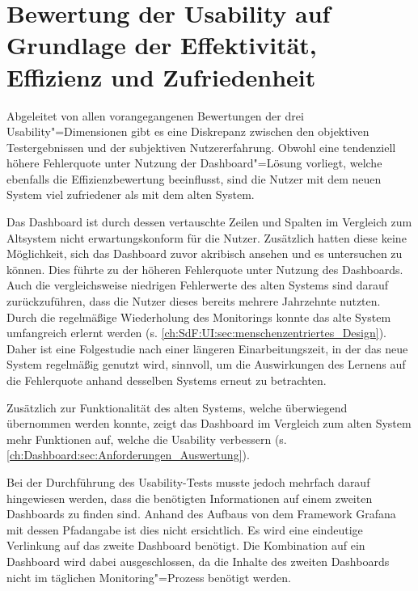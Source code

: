 \section{Bewertung der Usability auf Grundlage der Effektivität, Effizienz und Zufriedenheit}
\label{ch:Diskussion:Usability}

Abgeleitet von allen vorangegangenen Bewertungen der drei Usability"=Dimensionen gibt es eine Diskrepanz zwischen den objektiven Testergebnissen und der subjektiven Nutzererfahrung. Obwohl eine tendenziell höhere Fehlerquote unter Nutzung der Dash\-board"=Lösung vorliegt, welche ebenfalls die Effizienzbewertung beeinflusst, sind die Nutzer mit dem neuen System viel zufriedener als mit dem alten System.

Das Dash\-board ist durch dessen vertauschte Zeilen und Spalten im Vergleich zum Altsystem nicht erwartungskonform für die Nutzer. Zusätzlich hatten diese keine Möglichkeit, sich das Dash\-board zuvor akribisch ansehen und es untersuchen zu können. Dies führte zu der höheren Fehlerquote unter Nutzung des Dash\-boards. Auch die vergleichsweise niedrigen Fehlerwerte des alten Systems sind darauf zurückzuführen, dass die Nutzer dieses bereits mehrere Jahrzehnte nutzten. Durch die regelmäßige Wiederholung des Monitorings konnte das alte System umfangreich erlernt werden (s. \autoref{ch:SdF:UI:sec:menschenzentriertes_Design}). Daher ist eine Folgestudie nach einer längeren Einarbeitungszeit, in der das neue System regelmäßig genutzt wird, sinnvoll, um die Auswirkungen des Lernens auf die Fehlerquote anhand desselben Systems erneut zu betrachten.

Zusätzlich zur Funktionalität des alten Systems, welche überwiegend übernommen werden konnte, zeigt das Dash\-board im Vergleich zum alten System mehr Funktionen auf, welche die Usability verbessern (s. \autoref{ch:Dashboard:sec:Anforderungen_Auswertung}).

Bei der Durchführung des Usability-Tests musste jedoch mehrfach darauf hingewiesen werden, dass die benötigten Informationen auf einem zweiten Dash\-boards zu finden sind. Anhand des Aufbaus von dem Framework Grafana mit dessen Pfadangabe ist dies nicht ersichtlich. Es wird eine eindeutige Verlinkung auf das zweite Dashboard benötigt. Die Kombination auf ein Dash\-board wird dabei ausgeschlossen, da die Inhalte des zweiten Dash\-boards nicht im täglichen Monitoring"=Prozess benötigt werden.

